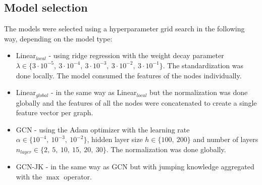 \subsection*{Model selection}

The models were selected using a hyperparameter grid search in the following way, depending on the model type:
\begin{itemize}
    \item Linear$_{local}$ - using ridge regression with the weight decay parameter
    $\lambda \in \{3 \cdot 10^{-5}, \ 3 \cdot 10^{-4}, \ 3 \cdot 10^{-3}, \ 3 \cdot 10^{-2}, \ 3 \cdot 10^{-1}\}$.
    The standardization was done locally.
    The model consumed the features of the nodes individually.
    \item Linear$_{global}$ - in the same way as Linear$_{local}$ but the normalization was done globally and
    the features of all the nodes were concatenated to create a single feature vector per graph.
    \item GCN - using the Adam optimizer with the learning rate $\alpha \in \{10^{-4}, \ 10^{-3}, \ 10^{-2}\}$,
    hidden layer size $h \in \{100, \ 200\}$ and number of layers $n_{layer} \in \{2, \ 5, \ 10, \ 15, \ 20, \ 30\}$.
    The normalization was done globally.
    \item GCN-JK - in the same way as GCN but with jumping knowledge aggregated with the $\max$ operator.
\end{itemize}